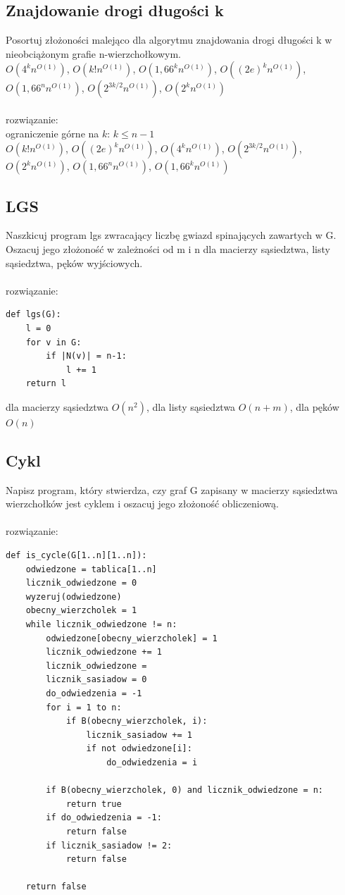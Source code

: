 \documentclass{article}
\begin{document}
\subsection*{Znajdowanie drogi długości k}
Posortuj złożoności malejąco dla algorytmu znajdowania drogi długości k w nieobciążonym grafie n-wierzchołkowym. \\
$O(4^k n^{O(1)})$, $O(k! n^{O(1)})$, $O(1,66^k n^{O(1)})$, $O((2e)^k n^{O(1)})$, $O(1,66^n n^{O(1)})$, $O(2^{3k/2} n^{O(1)})$, $O(2^k n^{O(1)})$ \\\\rozwiązanie:\\
ograniczenie górne na $k$: $k \leq n-1$ \\
$O(k! n^{O(1)})$, $O((2e)^k n^{O(1)})$, $O(4^k n^{O(1)})$, $O(2^{3k/2} n^{O(1)})$, $O(2^k n^{O(1)})$,  $O(1,66^n n^{O(1)})$, $O(1,66^k n^{O(1)})$


\subsection*{LGS}
Naszkicuj program lgs zwracający liczbę gwiazd spinających zawartych w G. Oszacuj jego złożoność w zależności od m i n 
dla macierzy sąsiedztwa, listy sąsiedztwa, pęków wyjściowych. \\\\rozwiązanie:\\

\begin{lstlisting}
def lgs(G):
	l = 0
	for v in G:
		if |N(v)| = n-1:
			l += 1
	return l
\end{lstlisting}
dla macierzy sąsiedztwa $O(n^2)$, dla listy sąsiedztwa $O(n + m)$, dla pęków $O(n)$

\subsection*{Cykl}
Napisz program, który stwierdza, czy graf G zapisany w macierzy sąsiedztwa wierzchołków jest cyklem i oszacuj jego złożoność obliczeniową. \\\\rozwiązanie:\\
\begin{lstlisting}
def is_cycle(G[1..n][1..n]):
	odwiedzone = tablica[1..n]
	licznik_odwiedzone = 0
	wyzeruj(odwiedzone)
	obecny_wierzcholek = 1
	while licznik_odwiedzone != n:
		odwiedzone[obecny_wierzcholek] = 1
		licznik_odwiedzone += 1
		licznik_odwiedzone = 
		licznik_sasiadow = 0
		do_odwiedzenia = -1
		for i = 1 to n:
			if B(obecny_wierzcholek, i):
				licznik_sasiadow += 1
				if not odwiedzone[i]:
					do_odwiedzenia = i

		if B(obecny_wierzcholek, 0) and licznik_odwiedzone = n:
			return true
		if do_odwiedzenia = -1:
			return false
		if licznik_sasiadow != 2:
			return false
	
	return false 
\end{lstlisting}
\end{document}
